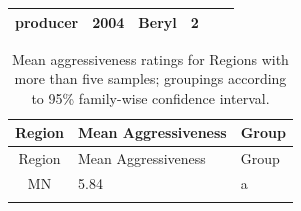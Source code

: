 \documentclass[fleqn,10pt,lineno]{wlpeerj} %
\theoremstyle{definition}
\theoremstyle{definition}
\theoremstyle{definition}
\theoremstyle{remark}
\begin{document}
\begin{longtable}[]{@{}lllrlr@{}}
\begin{minipage}[t]{0.12\columnwidth}
producer\strut
\end{minipage} & \begin{minipage}[t]{0.19\columnwidth}\raggedleft\strut
2004\strut
\end{minipage} & \begin{minipage}[t]{0.29\columnwidth}\raggedright\strut
Beryl\strut
\end{minipage} & \begin{minipage}[t]{0.04\columnwidth}\raggedleft\strut
2\strut
\end{minipage}\tabularnewline
\bottomrule
\end{longtable}

\begin{longtable}[]{@{}cll@{}}
\caption{\label{tab:region-aggressiveness} Mean aggressiveness ratings for
Regions with more than five samples; groupings according to 95\%
family-wise confidence interval.}\tabularnewline
\toprule
\begin{minipage}[b]{0.14\columnwidth}\centering\strut
Region\strut
\end{minipage} & \begin{minipage}[b]{0.25\columnwidth}\raggedright\strut
Mean Aggressiveness\strut
\end{minipage} & \begin{minipage}[b]{0.08\columnwidth}\raggedright\strut
Group\strut
\end{minipage}\tabularnewline
\midrule
\endfirsthead
\toprule
\begin{minipage}[b]{0.14\columnwidth}\centering\strut
Region\strut
\end{minipage} & \begin{minipage}[b]{0.25\columnwidth}\raggedright\strut
Mean Aggressiveness\strut
\end{minipage} & \begin{minipage}[b]{0.08\columnwidth}\raggedright\strut
Group\strut
\end{minipage}\tabularnewline
\midrule
\endhead
\begin{minipage}[t]{0.14\columnwidth}\centering\strut
MN\strut
\end{minipage} & \begin{minipage}[t]{0.25\columnwidth}\raggedright\strut
5.84\strut
\end{minipage} & \begin{minipage}[t]{0.08\columnwidth}\raggedright\strut
a\strut
\end{minipage}\tabularnewline
\begin{minipage}[t]{0.14\columnwidth}\centering\strut

\end{minipage}
\end{longtable}
\end{document}
